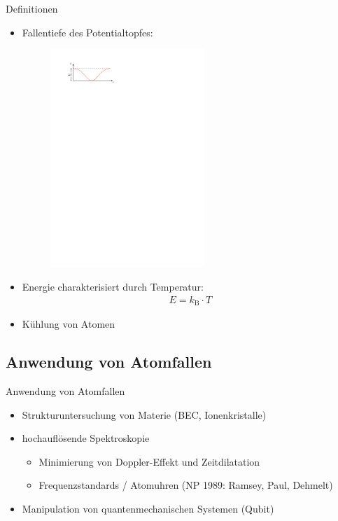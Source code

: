 \documentclass[12pt,xcolor=dvipsnames,professionalfonts]{beamer}
\begin{document}
\begin{frame}{Definitionen}
	\begin{itemize}
		\setlength\itemsep{1em}
		\item Fallentiefe des Potentialtopfes:
			\vspace{0.2cm}
			\begin{figure}
				\centering
				\includegraphics[width=0.55\textwidth]{./figures/fallentiefe.pdf}
			\end{figure}
		\item Energie charakterisiert durch Temperatur:
		\begin{align*}
		E = k_\mathrm{B} \cdot T
		\end{align*}
		
		\item Kühlung von Atomen
		
	\end{itemize}

\end{frame}

\subsection{Anwendung von Atomfallen}
\begin{frame}{Anwendung von Atomfallen}
	\begin{itemize}
		\setlength\itemsep{1em}
		\item Strukturuntersuchung von Materie (BEC, Ionenkristalle)
		
		\item hochauflösende Spektroskopie
			\begin{itemize}
				\item Minimierung von Doppler-Effekt und Zeitdilatation
				\item Frequenzstandards / Atomuhren (NP 1989: Ramsey, Paul, Dehmelt)
			\end{itemize}
		
		\item Manipulation von quantenmechanischen Systemen (Qubit)
	\end{itemize}
\end{frame}
\end{document}
